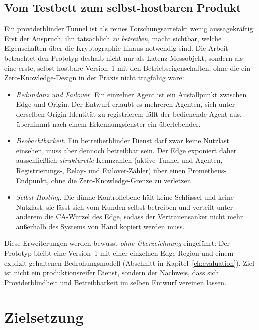 \subsection{Vom Testbett zum selbst-hostbaren Produkt}
\label{sec:vom-testbett-zum-produkt}

Ein providerblinder Tunnel ist als reines Forschungsartefakt wenig aussagekräftig:
Erst der Anspruch, ihn tatsächlich \emph{zu betreiben}, macht sichtbar, welche
Eigenschaften über die Kryptographie hinaus notwendig sind. Die Arbeit betrachtet
den Prototyp deshalb nicht nur als Latenz-Messobjekt, sondern als eine erste,
selbst-hostbare Version~1 mit den Betriebseigenschaften, ohne die ein
Zero-Knowledge-Design in der Praxis nicht tragfähig wäre:

\begin{itemize}
  \item \emph{Redundanz und Failover.} Ein einzelner Agent ist ein
    Ausfallpunkt zwischen Edge und Origin. Der Entwurf erlaubt es mehreren
    Agenten, sich unter derselben Origin-Identität zu registrieren; fällt der
    bedienende Agent aus, übernimmt nach einem Erkennungsfenster ein
    überlebender.
  \item \emph{Beobachtbarkeit.} Ein betreiberblinder Dienst darf zwar keine
    Nutzlast einsehen, muss aber dennoch betreibbar sein. Der Edge exponiert
    daher ausschließlich \emph{strukturelle} Kennzahlen (aktive Tunnel und
    Agenten, Registrierungs-, Relay- und Failover-Zähler) über einen
    Prometheus-Endpunkt, ohne die Zero-Knowledge-Grenze zu verletzen.
  \item \emph{Selbst-Hosting.} Die dünne Kontrollebene hält keine Schlüssel und
    keine Nutzlast; sie lässt sich vom Kunden selbst betreiben und verteilt
    unter anderem die CA-Wurzel des Edge, sodass der Vertrauensanker nicht mehr
    außerhalb des Systems von Hand kopiert werden muss.
\end{itemize}

Diese Erweiterungen werden bewusst \emph{ohne Überzeichnung} eingeführt: Der
Prototyp bleibt eine Version~1 mit einer einzelnen Edge-Region und einem
explizit gehaltenen Bedrohungsmodell (Abschnitt in Kapitel~\ref{ch:evaluation}).
Ziel ist nicht ein produktionsreifer Dienst, sondern der Nachweis, dass sich
Providerblindheit und Betreibbarkeit im selben Entwurf vereinen lassen.

\section{Zielsetzung}
\label{sec:zielsetzung}

